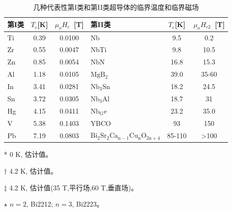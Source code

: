 \begin{table}[htbp]\small%
  \centering
  \caption{几种代表性第I类和第II类超导体的临界温度和临界磁场} \label{criticalparameters}
\begin{threeparttable}
  \begin{tabular}{|l|c|c||l|c|c|}
    \hline
    第I类 & $T_c$[K] & $\mu_o H_c$\tnote{*}\ [T] & 第II类 & $T_c$[K] & $\mu_o H_{c2}$\tnote{*}\ [T] \\ \hline 
    Ti & 0.39 & 0.0100 & Nb & 9.5 & 0.2\tnote{*} \\ \hline
    Zr & 0.55 & 0.0047 & NbTi & 9.8 & 10.5\tnote{$\dagger$} \\ \hline
    Zn & 0.85 & 0.0054 &NbN & 16.8 & 15.3\tnote{$\dagger$} \\ \hline
    Al & 1.18 & 0.0105&$\mathrm{MgB_2}$ & 39.0 & 35-60\tnote{$\ddagger$}\\ \hline
    In & 3.41 & 0.0281 & $\mathrm{Nb_3Sn}$ & 18.2 & 24.5\tnote{$\dagger$}  \\ \hline
    Sn & 3.72 & 0.0305  & $\mathrm{Nb_3Al}$ & 18.7 & 31\tnote{$\dagger$}\\ \hline
    Hg & 4.15 & 0.0411  & $\mathrm{Nb_Ge}$ & 23.2 & 35.0\tnote{$\dagger$}\\ \hline
    V & 5.38 & 0.1403& YBCO & 93 & 150\tnote{*}\\ \hline
    Pb & 7.19 & 0.0803 & $\mathrm{Bi_2Sr_2Ca_{n-1}Cu_{n}O_{2n+4}}$\tnote{$\star$} & 85-110 & >100\tnote{*} \\
    \hline
  \end{tabular}
 \begin{tablenotes}
        \footnotesize
        \item[*] 0 K, 估计值。 %
        \item[$\dagger$] 4.2 K, 估计值。%
        \item[$\ddagger$] 4.2 K, 估计值(35 T,平行场,60 T,垂直场)。%
        \item[$\star$] $n=2$, Bi2212; $n=3$, Bi2223。%
      \end{tablenotes}
    \end{threeparttable}
\end{table}


